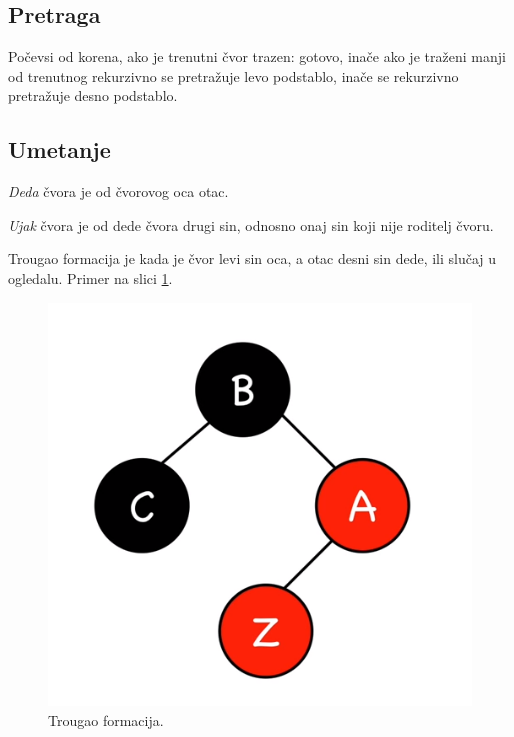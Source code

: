 \documentclass[a4paper]{article}
\begin{document}
\subsection{Pretraga}

Počevsi od korena, ako je trenutni čvor trazen: gotovo, inače ako
je traženi manji od trenutnog rekurzivno se pretražuje levo podstablo, inače se rekurzivno pretražuje desno podstablo.

\subsection{Umetanje}
\textit{Deda} čvora je od čvorovog oca otac.

\textit{Ujak} čvora je od dede čvora drugi sin, odnosno onaj sin koji nije roditelj čvoru.


    Trougao formacija je kada je čvor levi sin oca, a otac desni sin dede, ili slučaj u ogledalu. 
    Primer na slici \ref{fig:triangle}.
    \begin{figure}[h!]
        \begin{center}
        \includegraphics[scale=0.5]{triangle.png}
        \end{center}
        \caption{Trougao formacija.}
        \label{fig:triangle}
    \end{figure}
\end{document}
